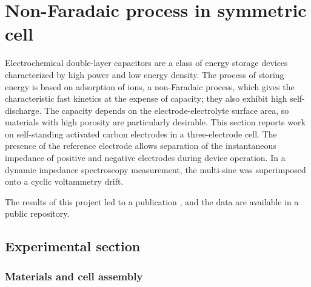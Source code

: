 \chapter{Non-Faradaic process in symmetric cell}
\label{chap:capacitor}

Electrochemical double-layer capacitors are a class of energy storage devices characterized by high power and low energy density. The process of storing energy is based on adsorption of ions, a non-Faradaic process, which gives the characteristic fast kinetics at the expense of capacity; they also exhibit high self-discharge. The capacity depends on the electrode-electrolyte surface area, so materials with high porosity are particularly desirable. This section reports work on self-standing activated carbon electrodes in a three-electrode cell. The presence of the reference electrode allows separation of the instantaneous impedance of positive and negative electrodes during device operation.
In a dynamic impedance spectroscopy measurement, the multi-sine was superimposed onto a cyclic voltammetry drift.

The results of this project led to a publication \cite{piantaEvaluationKineticParameters2023a}, and the data are available in a public repository.

\section{Experimental section}
\subsection{Materials and cell assembly}
